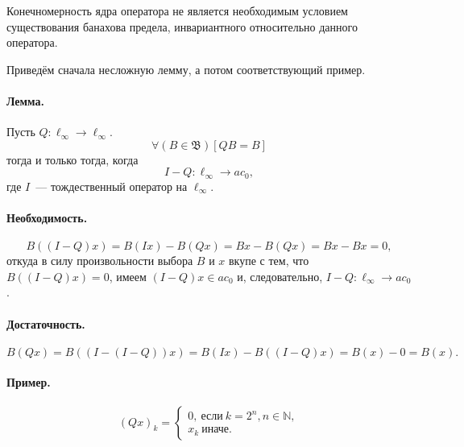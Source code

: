 Конечномерность ядра оператора не является необходимым условием существования
банахова предела, инвариантного относительно данного оператора.

Приведём сначала несложную лемму, а потом соответствующий пример.

\paragraph{Лемма.}

Пусть $Q:\ell_\infty \to \ell_\infty$.
\begin{equation}
	\forall(B\in\mathfrak{B})[QB = B]
\end{equation}
тогда и только тогда, когда
\begin{equation}\label{I-Q_to_ac_0}
	I-Q : \ell_\infty \to ac_0,
\end{equation}
где $I$~--- тождественный оператор на $\ell_\infty$.

\paragraph{Необходимость.}
\begin{equation}
	B((I-Q)x) =
	B(Ix) - B(Qx) =
	Bx - B(Qx)=
	Bx-Bx
	=
	0
	,
\end{equation}
откуда в силу произвольности выбора $B$ и $x$ вкупе с тем, что $B((I-Q)x)=0$,
имеем $(I-Q)x \in ac_0$ и, следовательно, $I-Q : \ell_\infty \to ac_0$.

\paragraph{Достаточность.}
\begin{equation}
	B(Qx) = B((I-(I-Q))x) =
	B(Ix)-B((I-Q)x) =
	B(x) - 0 = B(x).
\end{equation}


\paragraph{Пример.}

\begin{equation}
	(Qx)_k =
	\begin{cases}
		0,~\mbox{если}~ k = 2^n, n \in\mathbb{N},
		\\
		x_k~\mbox{иначе.}
	\end{cases}
\end{equation}

